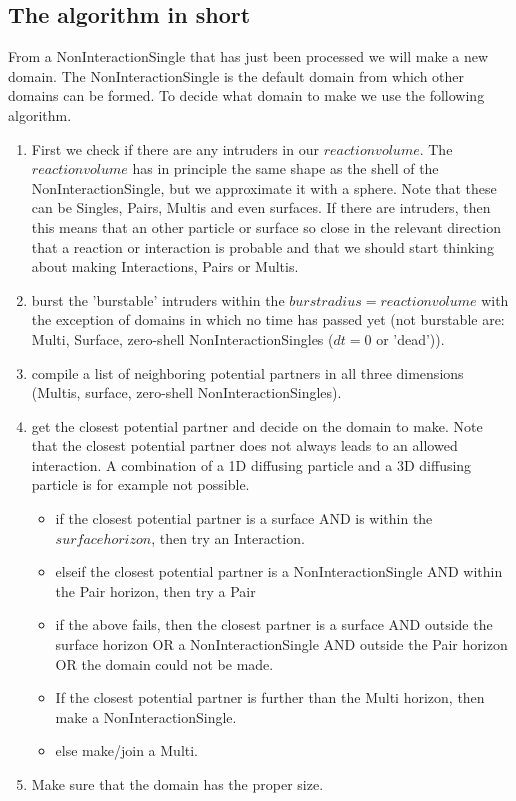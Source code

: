 \documentclass[a4paper,11pt]{article}
\begin{document}
\subsection{The algorithm in short}
From a NonInteractionSingle that has just been processed we will make a new domain. The NonInteractionSingle is the default
domain from which other domains can be formed. To decide what domain to make we use the following algorithm.
\begin{enumerate}
 \item First we check if there are any intruders in our $reaction volume$. The $reaction volume$ has in principle the same
       shape as the shell of the NonInteractionSingle, but we approximate it with a sphere. Note that these can be Singles,
       Pairs, Multis and even surfaces. If there are intruders, then this means that an other particle or surface so close
       in the relevant direction that a reaction or
       interaction is probable and that we should start thinking about making Interactions, Pairs or Multis.
 \item burst the 'burstable' intruders within the $burstradius=reaction volume$ with the exception of domains in which no
       time has passed yet (not burstable are: Multi, Surface, zero-shell NonInteractionSingles ($dt=0$ or 'dead')).
 \item compile a list of neighboring potential partners in all three dimensions (Multis, surface, zero-shell
       NonInteractionSingles).
 \item get the closest potential partner and decide on the domain to make. Note that the closest potential partner does not
       always leads to an allowed
       interaction. A combination of a 1D diffusing particle and a 3D diffusing particle is for example not possible.
 \begin{itemize}
  \item if the closest potential partner is a surface AND is within the $surface horizon$, then try an Interaction.
  \item elseif the closest potential partner is a NonInteractionSingle AND within the Pair horizon, then try a Pair
  \item if the above fails, then the closest partner is a surface AND outside the surface horizon OR a NonInteractionSingle
        AND outside the Pair horizon OR the domain could not be made.
  \item If the closest potential partner is further than the Multi horizon, then make a NonInteractionSingle.
  \item else make/join a Multi.
 \end{itemize}
 \item Make sure that the domain has the proper size.
\end{enumerate}
\end{document}
